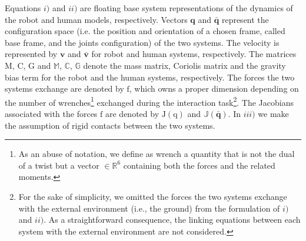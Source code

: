 %
\indent
Equations $i)$ and $ii)$ are floating base system representations of the
dynamics of the robot and  human models, respectively. 
Vectors $\bm {{q}}$ and $\bar{\bm q}$ represent the configuration space (i.e. the position and orientation of a chosen frame, called base frame, and the joints configuration) of the two systems. The velocity is represented by $\bm{v}$
 and $\bar{\bm v}$ for robot and human systems, respectively.
 The matrices $\mathrm{M}$,
  $\mathrm{C}$, $\mathrm{G}$ and $\mathbb{M}$, $\mathbb{C}$, $\mathbb{G}$ denote the 
  mass matrix, Coriolis matrix and the gravity bias term for the robot and the human 
  systems, respectively.  
   The forces the two systems
  exchange are denoted by $\bm{\mathrm{f}}$, which owns a proper dimension depending on the
  number of wrenches\footnote{As an abuse of notation, we define as wrench a quantity that is
   not the dual of a twist but a vector $\in \mathbb R^{6}$ containing both the forces and 
   the related moments.} exchanged during the interaction task\footnote{For the sake of simplicity,
  we omitted the forces the two systems exchange with the external environment 
  (i.e., the ground) from the 
  formulation of $i)$ and $ii)$. As a straightforward consequence, the linking
   equations between each system with the external environment are not considered.}. 
  The Jacobians associated with the forces $\bm{\mathrm{f}}$ are denoted by
   $\bm {\mathrm{J}}(\bm{\mathrm{q}}) $ and $\mathbb{J}(\bar{\bm q})$.  
   In $iii)$ we make the assumption of rigid contacts between the two systems.